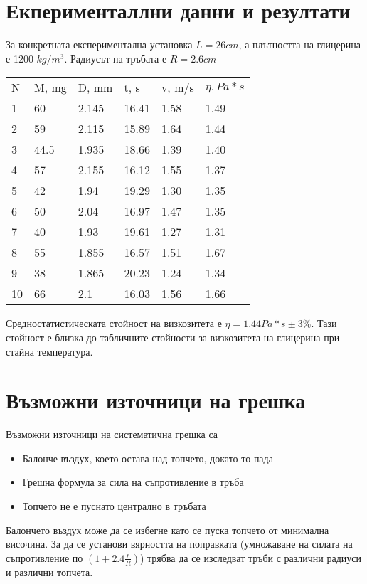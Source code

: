 \documentclass[aps, prb, twocolumn, a4paper]{revtex4-2}
\begin{document}
\section{Екперименталлни данни и резултати}
За конкретната експериментална установка $L=26cm$, а плътността на глицерина е 1200 $kg/m^3$. Радиусът на тръбата е $R=2.6 cm$ 

\begin{table}[ht]
\begin{tabular}{llllll}
    N  & M, mg & D, mm & t, s  & v, m/s & $\eta, Pa*s$\\
1  & 60    & 2.145 & 16.41 & 1.58   & 1.49                          \\
2  & 59    & 2.115 & 15.89 & 1.64   & 1.44                          \\
3  & 44.5  & 1.935 & 18.66 & 1.39   & 1.40                          \\
4  & 57    & 2.155 & 16.12 & 1.55   & 1.37                          \\
5  & 42    & 1.94  & 19.29 & 1.30   & 1.35                          \\
6  & 50    & 2.04  & 16.97 & 1.47   & 1.35                          \\
7  & 40    & 1.93  & 19.61 & 1.27   & 1.31                          \\
8  & 55    & 1.855 & 16.57 & 1.51   & 1.67                          \\
9  & 38    & 1.865 & 20.23 & 1.24   & 1.34                          \\
10 & 66    & 2.1   & 16.03 & 1.56   & 1.66                     
\end{tabular}
\end{table}
Средностатистическата стойност на визкозитета е $\bar{\eta}=1.44 Pa*s\pm 3\% $. Тази стойност е близка до табличните стойности за визкозитета на глицерина при стайна температура. 

\section{Възможни източници на грешка}
Възможни източници на систематична грешка са
\begin{itemize}
    \item Балонче въздух, което остава над топчето, докато то пада
    \item Грешна формула за сила на съпротивление в тръба 
    \item Топчето не е пуснато централно в тръбата
\end{itemize}
Балончето въздух може да се избегне като се пуска топчето от минимална височина. За да се установи вярността на поправката (умножаване на силата на съпротивление по $(1+2.4\frac{r}{R})$) трябва да се изследват тръби с различни радиуси и различни топчета.
\end{document}
